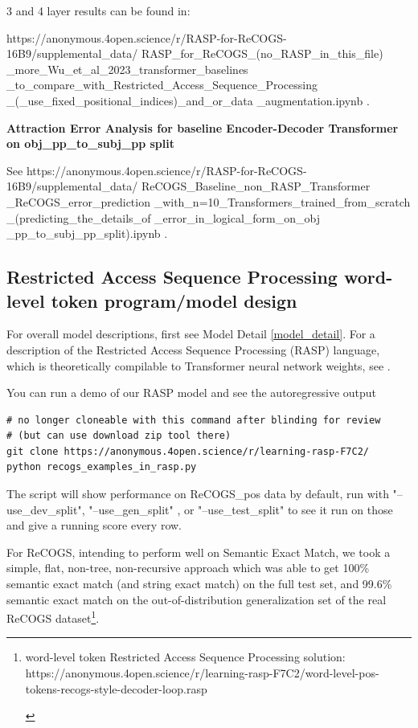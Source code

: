 \documentclass[11pt]{article}
\begin{document}
3 and 4 layer results can be found in:

https://anonymous.4open.science/r/RASP-for-ReCOGS-16B9/supplemental\_data/
RASP\_for\_ReCOGS\_(no\_RASP\_in\_this\_file)
\_more\_Wu\_et\_al\_2023\_transformer\_baselines
\_to\_compare\_with\_Restricted\_Access\_Sequence\_Processing
\_(\_use\_fixed\_positional\_indices)\_and\_or\_data
\_augmentation.ipynb .

\textbf{Attraction Error Analysis for \cite{Wu2023} baseline Encoder-Decoder Transformer on obj\_pp\_to\_subj\_pp split}

See https://anonymous.4open.science/r/RASP-for-ReCOGS-16B9/supplemental\_data/
ReCOGS\_Baseline\_non\_RASP\_Transformer
\_ReCOGS\_error\_prediction
\_with\_n=10\_Transformers\_trained\_from\_scratch
\_(predicting\_the\_details\_of
\_error\_in\_logical\_form\_on\_obj
\_pp\_to\_subj\_pp\_split).ipynb .

\clearpage

\subsection{Restricted Access Sequence Processing word-level token program/model design}
\label{rasp-word-level-model-design}

For overall model descriptions, first see Model Detail \ref{model_detail}.
For a description of the Restricted Access Sequence Processing (RASP) language, which is theoretically compilable to Transformer neural network weights, see \cite{Weiss2021}.

You can run a demo of our RASP model and see the autoregressive output 

\begin{tiny}
\begin{verbatim}
# no longer cloneable with this command after blinding for review
# (but can use download zip tool there)
git clone https://anonymous.4open.science/r/learning-rasp-F7C2/
python recogs_examples_in_rasp.py
\end{verbatim}
\end{tiny}

The script will show performance on \cite{Wu2023} ReCOGS\_pos data by default, run with "--use\_dev\_split", "--use\_gen\_split" , or "--use\_test\_split" to see it run on those and give a running score every row.

For ReCOGS, intending to perform well on Semantic Exact Match, we took a simple, flat, non-tree, non-recursive approach which was able to get 100\% semantic exact match (and string exact match) on the full test set, and 99.6\% semantic exact match on the out-of-distribution generalization set of the real ReCOGS dataset\footnote{\begin{footnotesize} word-level token Restricted Access Sequence Processing solution: https://anonymous.4open.science/r/learning-rasp-F7C2/word-level-pos-tokens-recogs-style-decoder-loop.rasp \end{footnotesize}}.
\end{document}
